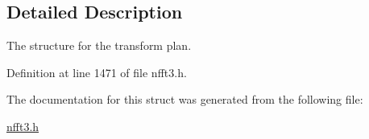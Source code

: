 \subsection{Detailed Description}
The structure for the transform plan. 

Definition at line 1471 of file nfft3.h.

The documentation for this struct was generated from the following file:\begin{CompactItemize}
\item 
\hyperlink{nfft3_8h}{nfft3.h}\end{CompactItemize}
